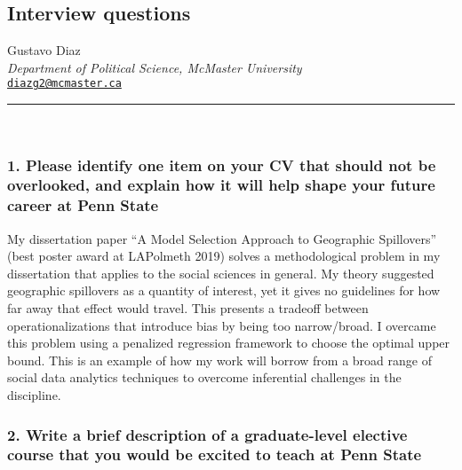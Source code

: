 \documentclass[
  12pt,
  letterpaper,
  DIV=11,
  numbers=noendperiod]{scrartcl}
\author{}
\date{}
\begin{document}
\ifdefined\Shaded\renewenvironment{Shaded}{\begin{tcolorbox}[breakable, frame hidden, enhanced, boxrule=0pt, borderline west={3pt}{0pt}{shadecolor}, interior hidden, sharp corners]}{\end{tcolorbox}}\fi

\hypertarget{interview-questions}{%
\subsection{Interview questions}\label{interview-questions}}

Gustavo Diaz\\
\emph{Department of Political Science, McMaster University}\\
\href{mailto:diazg2@mcmaster.ca}{\nolinkurl{diazg2@mcmaster.ca}}\\

\hrule

~

\hypertarget{please-identify-one-item-on-your-cv-that-should-not-be-overlooked-and-explain-how-it-will-help-shape-your-future-career-at-penn-state}{%
\subsubsection{1. Please identify one item on your CV that should not be
overlooked, and explain how it will help shape your future career at
Penn
State}\label{please-identify-one-item-on-your-cv-that-should-not-be-overlooked-and-explain-how-it-will-help-shape-your-future-career-at-penn-state}}

My dissertation paper ``A Model Selection Approach to Geographic
Spillovers'' (best poster award at LAPolmeth 2019) solves a
methodological problem in my dissertation that applies to the social
sciences in general. My theory suggested geographic spillovers as a
quantity of interest, yet it gives no guidelines for how far away that
effect would travel. This presents a tradeoff between
operationalizations that introduce bias by being too narrow/broad. I
overcame this problem using a penalized regression framework to choose
the optimal upper bound. This is an example of how my work will borrow
from a broad range of social data analytics techniques to overcome
inferential challenges in the discipline.

\hypertarget{write-a-brief-description-of-a-graduate-level-elective-course-that-you-would-be-excited-to-teach-at-penn-state}{%
\subsubsection{2. Write a brief description of a graduate-level elective
course that you would be excited to teach at Penn
State}\label{write-a-brief-description-of-a-graduate-level-elective-course-that-you-would-be-excited-to-teach-at-penn-state}}
\end{document}
